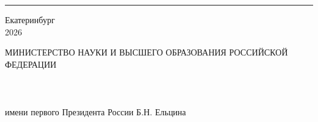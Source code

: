 \documentclass[a4paper,14pt]{extarticle}
\newcommand{\VKRYear}{2026}
\newcommand{\VKRPlace}{Екатеринбург}
\begin{document}
\vspace{24.3pt}
\noindent\hspace*{246.93pt}\rule{207.5pt}{0.4pt}\par

\vfill

{\centering
\VKRPlace\\
\VKRYear\par}
\vspace*{24.5pt}
\endgroup
\clearpage
\restoregeometry

\setcounter{page}{2}

\thispagestyle{vkrfooter}
\begingroup
\singlespacing
{}
\setlength{\parindent}{0pt}
\newcommand{\vkrblank}[1]{\rule[-4pt]{#1}{0.4pt}}
\newsavebox{\vkrfieldbox}
\let\vkroriginalunderline\underline
\renewcommand{\underline}[1]{%
  \leavevmode
  \begingroup
  \sbox{\vkrfieldbox}{#1}%
  \vphantom{\vkroriginalunderline{\usebox{\vkrfieldbox}}}%
  \rlap{\vkrblank{\wd\vkrfieldbox}}\usebox{\vkrfieldbox}%
  \endgroup}
\newcommand{\vkrdatefield}[3][c]{\underline{\makebox[#2][#1]{#3}}}
\newcommand{\vkrdate}[4][121.9pt]{%
  \mbox{«\vkrdatefield{27.8pt}{#2}»\hspace{0.8pt}%
  \vkrdatefield{#1}{#3}\hspace{0.4pt}20\vkrdatefield[l]{16.8pt}{#4}\hspace{0.4pt}г.}}
\newcommand{\vkrsmallstrut}{\vrule height 8.68pt depth 3.72pt width 0pt}
\vspace*{-18.2pt}
{\centering
МИНИСТЕРСТВО НАУКИ И ВЫСШЕГО ОБРАЗОВАНИЯ РОССИЙСКОЙ ФЕДЕРАЦИИ\\
\\
\\
\\
имени первого Президента России Б.Н. Ельцина\par}
\end{document}
